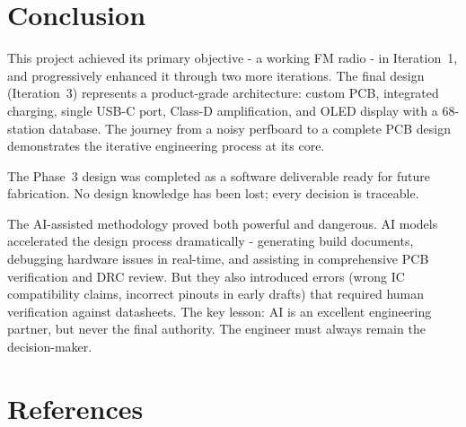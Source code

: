 
\section{Conclusion}

This project achieved its primary objective - a working FM radio - in
Iteration~1, and progressively enhanced it through two more iterations.  The
final design (Iteration~3) represents a product-grade architecture: custom
PCB, integrated charging, single USB-C port, Class-D amplification, and OLED
display with a 68-station database.  The journey from a noisy perfboard to a
complete PCB design demonstrates the iterative engineering process at its
core.

The Phase~3 design was completed as a software deliverable ready for future
fabrication. No design knowledge has been lost; every decision is traceable.

The AI-assisted methodology proved both powerful and dangerous.  AI models
accelerated the design process dramatically - generating build documents,
debugging hardware issues in real-time, and assisting in comprehensive PCB
verification and DRC review.  But they also introduced errors (wrong IC compatibility
claims, incorrect pinouts in early drafts) that required human verification
against datasheets.  The key lesson: AI is an excellent engineering partner,
but never the final authority.  The engineer must always remain the
decision-maker.

\section{References}

